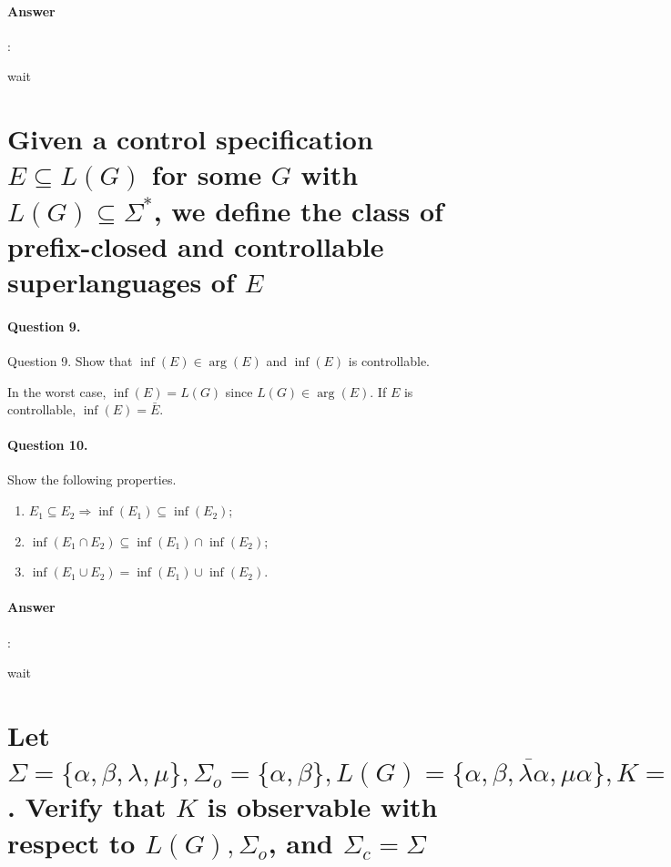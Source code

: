 \documentclass{article}
\begin{document}
\paragraph{Answer}:

wait


\section{Given a control specification $E \subseteq L(G)$ for some $G$ with $L(G) \subseteq \Sigma^*$, we define the class of prefix-closed and controllable superlanguages of $E$}

\paragraph{Question 9.} Question 9. Show that $\inf (E) \in \arg (E)$ and $\inf (E)$ is controllable.

In the worst case, $\inf (E)=L(G)$ since $L(G) \in \arg (E)$. If $E$ is controllable, $\inf (E)=\bar{E}$.

\paragraph{Question 10.} Show the following properties.

\begin{enumerate}
  \item  $E_1 \subseteq E_2 \Longrightarrow \inf \left(E_1\right) \subseteq \inf \left(E_2\right)$;
  \item $\inf \left(E_1 \cap E_2\right) \subseteq \inf \left(E_1\right) \cap \inf \left(E_2\right)$;
  \item $\inf \left(E_1 \cup E_2\right)=\inf \left(E_1\right) \cup \inf \left(E_2\right)$.
\end{enumerate}

\paragraph{Answer}:

wait

\section{Let $\Sigma=\{\alpha, \beta, \lambda, \mu\}, \Sigma_o=\{\alpha, \beta\}, L(G)=\overline{\{\alpha, \beta, \lambda \alpha, \mu \alpha\}}, K=\overline{\{\alpha, \lambda \alpha\}}$. Verify that $K$ is observable with respect to $L(G), \Sigma_o$, and $\Sigma_c=\Sigma$}
\end{document}
